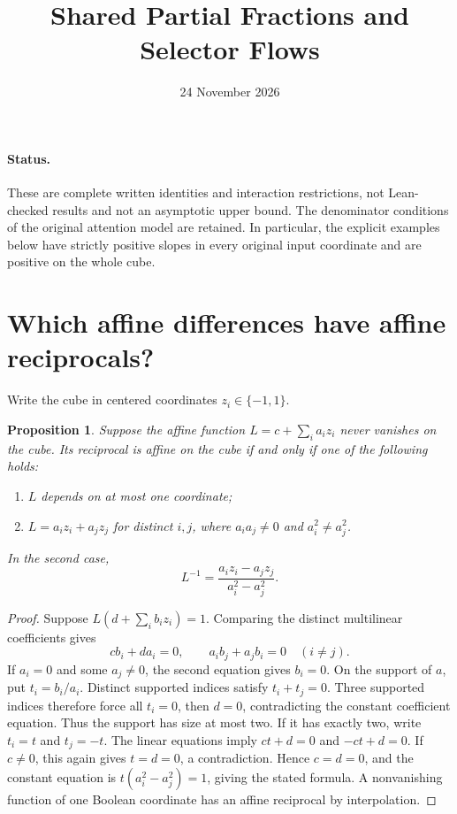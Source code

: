 \documentclass[11pt]{article}
\title{Shared Partial Fractions and Selector Flows}
\author{}
\date{24 November 2026}
\newtheorem{proposition}[theorem]{Proposition}
\begin{document}
\maketitle

\paragraph{Status.}
These are complete written identities and interaction restrictions, not
Lean-checked results and not an asymptotic upper bound. The denominator
conditions of the original attention model are retained. In particular,
the explicit examples below have strictly positive slopes in every
original input coordinate and are positive on the whole cube.

\section{Which affine differences have affine reciprocals?}

Write the cube in centered coordinates $z_i\in\{-1,1\}$.

\begin{proposition}\label{prop:inverse}
Suppose the affine function $L=c+\sum_i a_i z_i$ never vanishes on the
cube. Its reciprocal is affine on the cube if and only if one of the
following holds:
\begin{enumerate}
\item $L$ depends on at most one coordinate;
\item $L=a_i z_i+a_j z_j$ for distinct $i,j$, where
      $a_i a_j\ne0$ and $a_i^2\ne a_j^2$.
\end{enumerate}
In the second case,
\[
 L^{-1}=\frac{a_i z_i-a_j z_j}{a_i^2-a_j^2}.
\]
\end{proposition}
\begin{proof}
Suppose $L(d+\sum_i b_i z_i)=1$. Comparing the distinct multilinear
coefficients gives
\[
 cb_i+da_i=0,\qquad a_i b_j+a_j b_i=0\quad(i\ne j).
\]
If $a_i=0$ and some $a_j\ne0$, the second equation gives $b_i=0$.
On the support of $a$, put $t_i=b_i/a_i$. Distinct supported indices
satisfy $t_i+t_j=0$. Three supported indices therefore force all
$t_i=0$, then $d=0$, contradicting the constant coefficient equation.
Thus the support has size at most two. If it has exactly two, write
$t_i=t$ and $t_j=-t$. The linear equations imply $ct+d=0$ and
$-ct+d=0$. If $c\ne0$, this again gives $t=d=0$, a contradiction.
Hence $c=d=0$, and the constant equation is
$t(a_i^2-a_j^2)=1$, giving the stated formula. A nonvanishing function
of one Boolean coordinate has an affine reciprocal by interpolation.
\end{proof}
\end{document}
